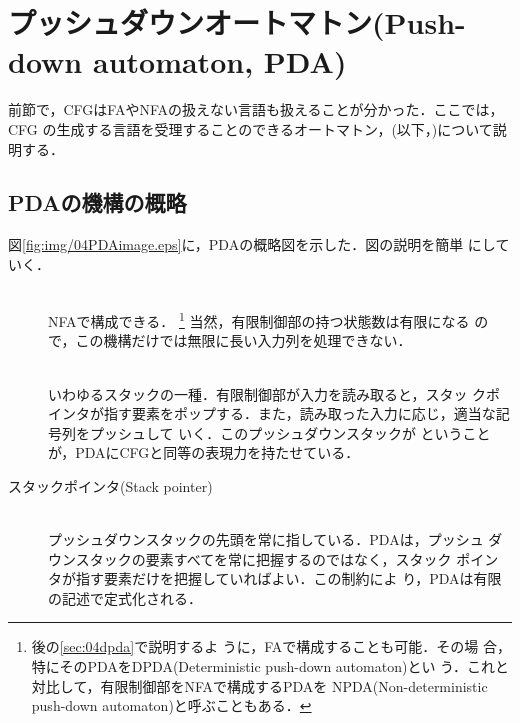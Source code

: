 
\section{プッシュダウンオートマトン(Push-down automaton, PDA)}
前節で，CFGはFAやNFAの扱えない言語も扱えることが分かった．ここでは，CFG
の生成する言語を受理することのできるオートマトン，(以下，)について説明する．

\subsection{PDAの機構の概略}


図\ref{fig:img/04PDAimage.eps}に，PDAの概略図を示した．図の説明を簡単
にしていく．

\begin{description}
 \item[] \mbox{} \\
            NFAで構成できる． \footnote{後の\ref{sec:04dpda}で説明するよ
            うに，FAで構成することも可能．その場
            合，特にそのPDAをDPDA(Deterministic push-down automaton)とい
            う．これと対比して，有限制御部をNFAで構成するPDAを
            NPDA(Non-deterministic push-down automaton)と呼ぶこともある．}
            当然，有限制御部の持つ状態数は有限になる
            ので，この機構だけでは無限に長い入力列を処理できない．
 \item[] \mbox{} \\
            いわゆるスタックの一種．有限制御部が入力を読み取ると，スタッ
            クポインタが指す要素をポップする．また，読み取った入力に応じ，適当な記号列をプッシュして
            いく．このプッシュダウンスタックが
            ということが，PDAにCFGと同等の表現力を持たせている．
 \item[スタックポインタ(Stack pointer)] \mbox{} \\
            プッシュダウンスタックの先頭を常に指している．PDAは，プッシュ
            ダウンスタックの要素すべてを常に把握するのではなく，スタック
            ポインタが指す要素だけを把握していればよい．この制約によ
            り，PDAは有限の記述で定式化される．
\end{description}

